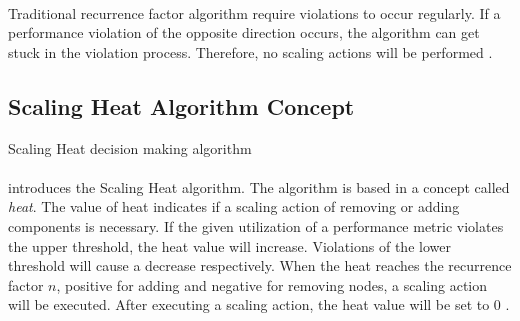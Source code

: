 \paragraph{}Traditional recurrence factor algorithm require violations to occur regularly. If a performance violation of the opposite direction occurs, the algorithm can get stuck in the violation process. Therefore, no scaling actions will be performed \cite{Barna2017ElasticContainerApps}.


\subsection{Scaling Heat Algorithm Concept}
\label{sec:04_background_scaling-heat}
\begin{algorithm}[H]
\SetAlgoLined
{}
\caption{Scaling Heat decision making algorithm\cite{Barna2017ElasticContainerApps}}
\label{alg:04_scal-heat_concept_algo}
\end{algorithm}


\paragraph{} introduces the Scaling Heat algorithm.
The algorithm is based in a concept called \textit{heat}. The value of heat indicates if a scaling action of removing or adding components is necessary.
If the given utilization of a performance metric violates the upper threshold, the heat value will increase. Violations of the lower threshold will cause a decrease respectively.
When the heat reaches the recurrence factor $n$, positive for adding and negative for removing nodes, a scaling action will be executed.
After executing a scaling action, the heat value will be set to 0 \cite{Barna2017ElasticContainerApps}.


